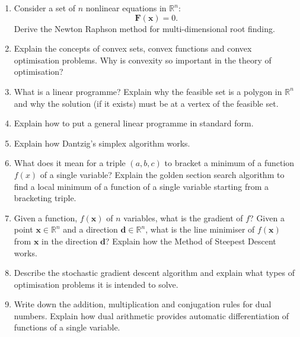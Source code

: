 \documentclass[11pt]{article}
\newcommand*{\xv}{\mathbf{x}}
\newcommand*{\dv}{\mathbf{d}}
\begin{document}
\begin{multicols}{2}
\begin{enumerate}
\item
Consider a set of $n$ nonlinear equations in $\mathbb{R}^n$:
\begin{displaymath}
\mathbf{F}(\xv) = 0.
\end{displaymath}
Derive the Newton Raphson method for multi-dimensional root finding. 
\item 
Explain the concepts of convex sets, convex functions and convex optimisation problems. Why is convexity so important in the theory of optimisation?
\item
What is a linear programme? Explain why the feasible set is a polygon in $\mathbb{R}^n$ and why the solution (if it exists) must be at a vertex of the feasible set.
\item
Explain how to put a general linear programme in standard form.
\item
Explain how Dantzig's simplex algorithm works.
\item
What does it mean for a triple $(a, b, c)$ to bracket a minimum of a function $f(x)$ of a single variable? Explain the golden section search algorithm to find a local minimum of a function of a single variable starting from a bracketing triple.
\item
Given a function, $f(\xv)$ of $n$ variables, what is the gradient of $f$? Given a point $\xv \in \mathbb{R}^n$ and a direction $\dv \in \mathbb{R}^n$, what is the line minimiser of $f(\xv)$ from $\xv$ in the direction $\dv$? Explain how the Method of Steepest Descent works.
\item
Describe the stochastic gradient descent algorithm and explain what types of optimisation problems it is intended to solve.
\item
Write down the addition, multiplication and conjugation rules for dual numbers. Explain how dual arithmetic provides automatic differentiation of functions of a single variable. 
\end{enumerate}

\end{multicols}
\end{document}

